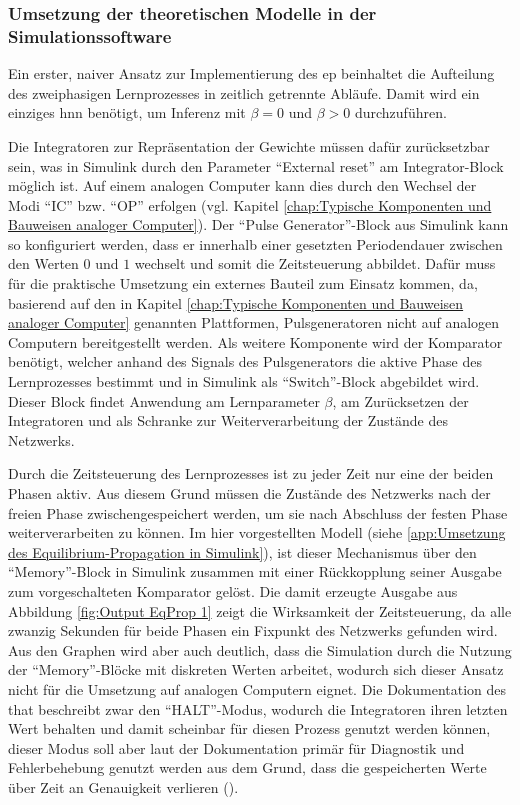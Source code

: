 \subsubsection{Umsetzung der theoretischen Modelle in der Simulationssoftware}
\label{chap:Umsetzung der theoretischen Modelle in der Simulationssoftware}

Ein erster, naiver Ansatz zur Implementierung des \ac{ep} beinhaltet die Aufteilung des zweiphasigen Lernprozesses in zeitlich getrennte Abläufe. Damit wird ein einziges \ac{hnn} benötigt, um Inferenz mit \(\beta=0\) und \(\beta>0\) durchzuführen.

Die Integratoren zur Repräsentation der Gewichte müssen dafür zurücksetzbar sein, was in Simulink durch den Parameter "`External reset"' am Integrator-Block möglich ist. Auf einem analogen Computer kann dies durch den Wechsel der Modi "`IC"' bzw. "`OP"' erfolgen (vgl. Kapitel \ref{chap:Typische Komponenten und Bauweisen analoger Computer}). Der "`Pulse Generator"'-Block aus Simulink kann so konfiguriert werden, dass er innerhalb einer gesetzten Periodendauer zwischen den Werten \(0\) und \(1\) wechselt und somit die Zeitsteuerung abbildet. Dafür muss für die praktische Umsetzung ein externes Bauteil zum Einsatz kommen, da, basierend auf den in Kapitel \ref{chap:Typische Komponenten und Bauweisen analoger Computer} genannten Plattformen, Pulsgeneratoren nicht auf analogen Computern bereitgestellt werden. Als weitere Komponente wird der Komparator benötigt, welcher anhand des Signals des Pulsgenerators die aktive Phase des Lernprozesses bestimmt und in Simulink als "`Switch"'-Block abgebildet wird. Dieser Block findet Anwendung am Lernparameter \(\beta\), am Zurücksetzen der Integratoren und als Schranke zur Weiterverarbeitung der Zustände des Netzwerks.

Durch die Zeitsteuerung des Lernprozesses ist zu jeder Zeit nur eine der beiden Phasen aktiv. Aus diesem Grund müssen die Zustände des Netzwerks nach der freien Phase zwischengespeichert werden, um sie nach Abschluss der festen Phase weiterverarbeiten zu können. Im hier vorgestellten Modell (siehe \ref{app:Umsetzung des Equilibrium-Propagation in Simulink}), ist dieser Mechanismus über den "`Memory"'-Block in Simulink zusammen mit einer Rückkopplung seiner Ausgabe zum vorgeschalteten Komparator gelöst. Die damit erzeugte Ausgabe aus Abbildung \ref{fig:Output EqProp 1} zeigt die Wirksamkeit der Zeitsteuerung, da alle zwanzig Sekunden für beide Phasen ein Fixpunkt des Netzwerks gefunden wird. Aus den Graphen wird aber auch deutlich, dass die Simulation durch die Nutzung der "`Memory"'-Blöcke mit diskreten Werten arbeitet, wodurch sich dieser Ansatz nicht für die Umsetzung auf analogen Computern eignet. Die Dokumentation des \ac{that} beschreibt zwar den "`HALT"'-Modus, wodurch die Integratoren ihren letzten Wert behalten und damit scheinbar für diesen Prozess genutzt werden können, dieser Modus soll aber laut der Dokumentation primär für Diagnostik und Fehlerbehebung genutzt werden \ua aus dem Grund, dass die gespeicherten Werte über Zeit an Genauigkeit verlieren (\cite[vgl.]{website:anabrid:that-docs}).

